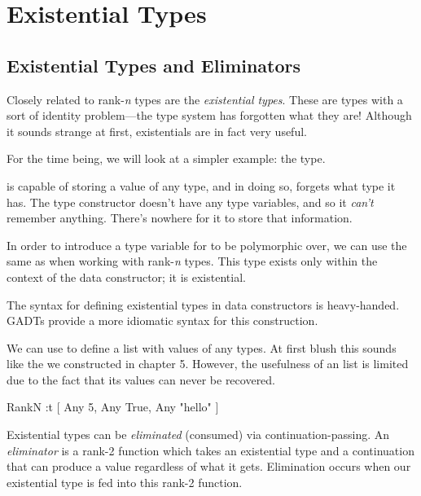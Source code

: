 \documentclass[book.tex]{subfiles}
\begin{document}
\chapter{Existential Types}

\section{Existential Types and Eliminators}

Closely related to rank-\emph{n} types are the \emph{existential types}. These
are types with a sort of identity problem---the type system has forgotten what
they are! Although it sounds strange at first, existentials are in fact very
useful.

For the time being, we will look at a simpler example: the  type.


 is capable of storing a value of any type, and in doing so, forgets
what type it has. The type constructor doesn't have any type variables, and so
it \emph{can't} remember anything. There's nowhere for it to store that
information.

In order to introduce a type variable for  to be polymorphic over, we
can use the same  as when working with rank-\emph{n} types. This
 type exists only within the context of the  data constructor; it
is existential.

The syntax for defining existential types in data constructors is heavy-handed.
GADTs provide a more idiomatic syntax for this construction.


We can use  to define a list with values of any types. At first blush
this sounds like the  we constructed in chapter 5. However,
the usefulness of an  list is limited due to the fact that its values
can never be recovered.


\begin{dorepl}{RankN}
:t [ Any 5, Any True, Any "hello" ]
\end{dorepl}

Existential types can be \emph{eliminated} (consumed) via continuation-passing.
An \emph{eliminator} is a rank-2 function which takes an existential type and a
continuation that can produce a value regardless of what it gets. Elimination
occurs when our existential type is fed into this rank-2 function.
\end{document}
